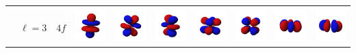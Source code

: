\begin{landscape}
\begin{xltabular}{\linewidth}{C C C c c c c c c c}
& & &  &  &  &  &  & &  \\ %

\addlinespace

&  &  & 
\includegraphics[width=1.6cm]{tableau_geometrie_orbitale_modelisation/Fz3_orbital.png} 
&
\includegraphics[width=1.6cm]{tableau_geometrie_orbitale_modelisation/Fxz2_orbital.png}  
&
\includegraphics[width=1.6cm]{tableau_geometrie_orbitale_modelisation/Fyz2_orbital.png} 
& 
\includegraphics[width=1.6cm]{tableau_geometrie_orbitale_modelisation/Fxyz_orbital.png} 
&
\includegraphics[width=1.6cm]{tableau_geometrie_orbitale_modelisation/Fz(x2-y2)_orbital.png} 
& 
\includegraphics[width=1.6cm]{tableau_geometrie_orbitale_modelisation/Fx(x2-3y2)_orbital.png}
&
\includegraphics[width=1.6cm]{tableau_geometrie_orbitale_modelisation/Fy(3x2-y2)_orbital.png} \\


\end{xltabular}
\end{landscape}
